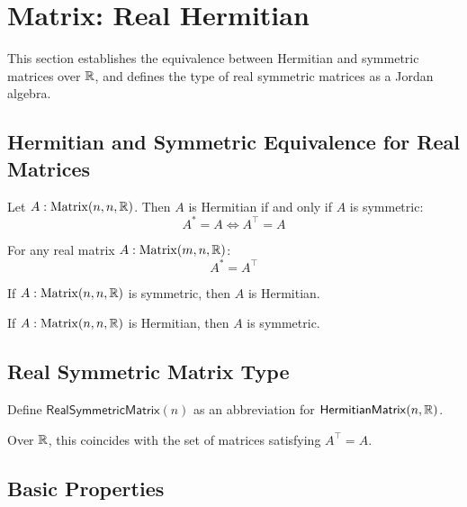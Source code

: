 \section{Matrix: Real Hermitian}

This section establishes the equivalence between Hermitian and symmetric matrices over $\mathbb{R}$, and defines the type of real symmetric matrices as a Jordan algebra.

\subsection{Hermitian and Symmetric Equivalence for Real Matrices}

\begin{theorem}
Let $A : \mathrm{Matrix}(n, n, \mathbb{R})$. Then $A$ is Hermitian if and only if $A$ is symmetric:
\[ A^* = A \iff A^\top = A \]
\end{theorem}

\begin{theorem}
For any real matrix $A : \mathrm{Matrix}(m, n, \mathbb{R})$:
\[ A^* = A^\top \]
\end{theorem}

\begin{lemma}
If $A : \mathrm{Matrix}(n, n, \mathbb{R})$ is symmetric, then $A$ is Hermitian.
\end{lemma}

\begin{lemma}
If $A : \mathrm{Matrix}(n, n, \mathbb{R})$ is Hermitian, then $A$ is symmetric.
\end{lemma}

\subsection{Real Symmetric Matrix Type}

\begin{definition}[RealSymmetricMatrix]
Define $\mathsf{RealSymmetricMatrix}(n)$ as an abbreviation for $\mathsf{HermitianMatrix}(n, \mathbb{R})$.

Over $\mathbb{R}$, this coincides with the set of matrices satisfying $A^\top = A$.
\end{definition}

\subsection{Basic Properties}

